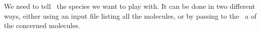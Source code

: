 We need to tell \Antioch\ the species we want to play
with. It can be done in two different ways, either using
an input file listing all the molecules, or by passing to
the \ChemicalMixture\ a \stdvector[\stdstring] of the concerned
molecules.
